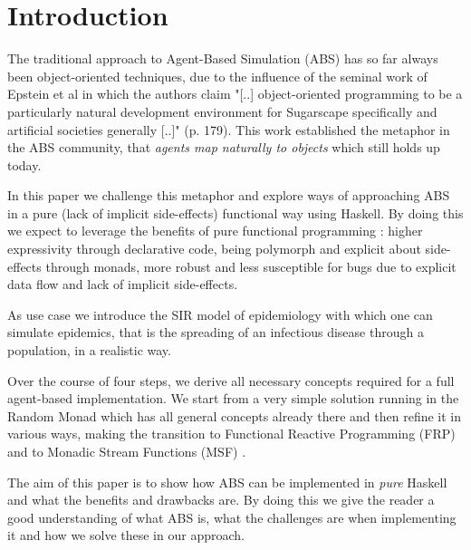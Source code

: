 \section{Introduction}
The traditional approach to Agent-Based Simulation (ABS) has so far always been object-oriented techniques, due to the influence of the seminal work of Epstein et al \cite{epstein_growing_1996} in which the authors claim "[..] object-oriented programming to be a particularly natural development environment for Sugarscape specifically and artificial societies generally [..]" (p. 179). This work established the metaphor in the ABS community, that \textit{agents map naturally to objects} \cite{north_managing_2007} which still holds up today.

In this paper we challenge this metaphor and explore ways of approaching ABS in a pure (lack of implicit side-effects) functional way using Haskell. By doing this we expect to leverage the benefits of pure functional programming \cite{hudak_history_2007}: higher expressivity through declarative code, being polymorph and explicit about side-effects through monads, more robust and less susceptible for bugs due to explicit data flow and lack of implicit side-effects.

As use case we introduce the SIR model of epidemiology with which one can simulate epidemics, that is the spreading of an infectious disease through a population, in a realistic way.

Over the course of four steps, we derive all necessary concepts required for a full agent-based implementation. We start from a very simple solution running in the Random Monad which has all general concepts already there and then refine it in various ways, making the transition to Functional Reactive Programming (FRP) \cite{wan_functional_2000} and to Monadic Stream Functions (MSF) \cite{perez_functional_2016}.

The aim of this paper is to show how ABS can be implemented in \textit{pure} Haskell and what the benefits and drawbacks are. By doing this we give the reader a good understanding of what ABS is, what the challenges are when implementing it and how we solve these in our approach.

